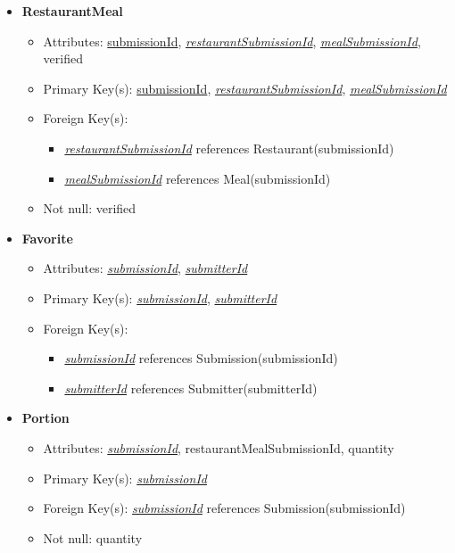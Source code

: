 \begin{itemize}
        \newpage 
        
        \item \textbf{RestaurantMeal}
        \begin{itemize}
            \item Attributes: \underline{submissionId}, \underline{\textit{restaurantSubmissionId}}, \underline{\textit{mealSubmissionId}}, verified
            \item Primary Key(s): \underline{submissionId}, \underline{\textit{restaurantSubmissionId}}, \underline{\textit{mealSubmissionId}}
            \item Foreign Key(s): 
                \begin{itemize}
                    \item \underline{\textit{restaurantSubmissionId}} references Restaurant(submissionId)
                    \item \underline{\textit{mealSubmissionId}} references Meal(submissionId)
                \end{itemize}   
            \item Not null: verified
        \end{itemize}

        \item \textbf{Favorite}
        \begin{itemize}
            \item Attributes: \underline{\textit{submissionId}}, \underline{\textit{submitterId}}
            \item Primary Key(s): \underline{\textit{submissionId}}, \underline{\textit{submitterId}}
            \item Foreign Key(s): 
                \begin{itemize}
                    \item \underline{\textit{submissionId}} references Submission(submissionId)
                    \item \underline{\textit{submitterId}} references Submitter(submitterId)
                \end{itemize}
        \end{itemize}

        \item \textbf{Portion}
        \begin{itemize}
            \item Attributes: \underline{\textit{submissionId}}, restaurantMealSubmissionId, quantity
            \item Primary Key(s): \underline{\textit{submissionId}}
            \item Foreign Key(s): \underline{\textit{submissionId}} references Submission(submissionId)
            \item Not null: quantity
        \end{itemize}


\end{itemize}

